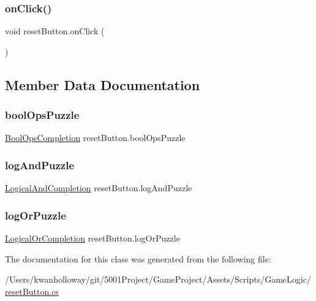 \subsubsection{\texorpdfstring{on\+Click()}{onClick()}}
{\footnotesize\ttfamily void reset\+Button.\+on\+Click (\begin{DoxyParamCaption}{ }\end{DoxyParamCaption})}



\subsection{Member Data Documentation}
\mbox{\label{classreset_button_a925179bba89fb6a34faa295e1ad34d55}} 
\subsubsection{\texorpdfstring{bool\+Ops\+Puzzle}{boolOpsPuzzle}}
{\footnotesize\ttfamily \hyperlink{class_bool_ops_completion}{Bool\+Ops\+Completion} reset\+Button.\+bool\+Ops\+Puzzle}

\mbox{\label{classreset_button_a6a9696f84fedc3c1c25eb5de3162a760}} 
\subsubsection{\texorpdfstring{log\+And\+Puzzle}{logAndPuzzle}}
{\footnotesize\ttfamily \hyperlink{class_logical_and_completion}{Logical\+And\+Completion} reset\+Button.\+log\+And\+Puzzle}

\mbox{\label{classreset_button_ae3e39078f403612b4070e88568015de6}} 
\subsubsection{\texorpdfstring{log\+Or\+Puzzle}{logOrPuzzle}}
{\footnotesize\ttfamily \hyperlink{class_logical_or_completion}{Logical\+Or\+Completion} reset\+Button.\+log\+Or\+Puzzle}



The documentation for this class was generated from the following file\+:\begin{DoxyCompactItemize}
\item 
/\+Users/kwanholloway/git/5001\+Project/\+Game\+Project/\+Assets/\+Scripts/\+Game\+Logic/\hyperlink{reset_button_8cs}{reset\+Button.\+cs}\end{DoxyCompactItemize}
